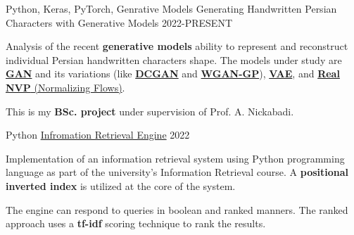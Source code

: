 

\begin{cventries}

  \cventry
    {Python, Keras, PyTorch, Genrative Models} %
    {Generating Handwritten Persian Characters with Generative Models} %
    {} %
    {2022-PRESENT} %
    {
      \begin{cvitems} %
      	\item {Analysis of the recent \textbf{generative models} ability to represent and reconstruct individual Persian handwritten characters shape. The models under study are \href{https://arxiv.org/abs/1406.2661}{\textbf{GAN}} and its variations (like \href{https://arxiv.org/abs/1511.06434}{\textbf{DCGAN}} and \href{https://arxiv.org/abs/1704.00028}{\textbf{WGAN-GP}}), \href{https://arxiv.org/abs/1312.6114}{\textbf{VAE}}, and \href{https://arxiv.org/abs/1605.08803}{\textbf{Real NVP} (Normalizing Flows)}.}
      	\item {This is my \textbf{BSc. project} under supervision of Prof. A. Nickabadi.}
      \end{cvitems}
    }

  \cventry
    {Python} %
    {\href{https://github.com/radinshayanfar/AUT-IR}{Infromation Retrieval Engine}} %
    {} %
    {2022} %
    {
      \begin{cvitems} %
      	\item {Implementation of an information retrieval system using Python programming language as part of the university's Information Retrieval course. A \textbf{positional inverted index} is utilized at the core of the system.}
      	\item {The engine can respond to queries in boolean and ranked manners. The ranked approach uses a \textbf{tf-idf} scoring technique to rank the results.}
      \end{cvitems}
    }


\end{cventries}
